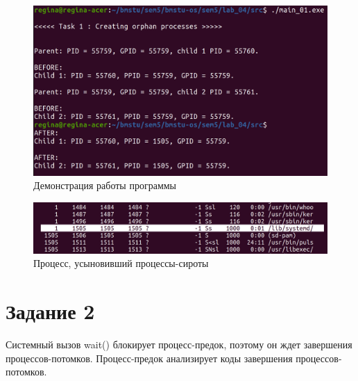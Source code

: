 \begin{figure}[H]
	\begin{center}
		\includegraphics[scale=0.3]{inc/orphans.png}
	\end{center}
	\captionsetup{justification=centering}
	\caption{Демонстрация работы программы}
	\label{img:example}
\end{figure}

\begin{figure}[H]
	\begin{center}
		\includegraphics[scale=0.3]{inc/arg.png}
	\end{center}
	\captionsetup{justification=centering}
	\caption{Процесс, усыновивший процессы-сироты}
	\label{img:arg}
\end{figure}

\section*{Задание 2}

Системный вызов wait() блокирует процесс-предок, поэтому он ждет завершения процессов-потомков. Процесс-предок анализирует коды завершения процессов-потомков. 
\clearpage

